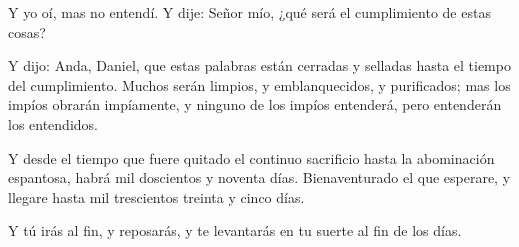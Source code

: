  Y yo oí, mas no entendí. Y dije: Señor mío, ¿qué será el
cumplimiento de estas cosas?

 Y dijo: Anda, Daniel, que estas palabras están cerradas y
selladas hasta el tiempo del cumplimiento.  Muchos serán
limpios, y emblanquecidos, y purificados; mas los impíos obrarán
impíamente, y ninguno de los impíos entenderá, pero entenderán los
entendidos.

 Y desde el tiempo que fuere quitado el continuo sacrificio
hasta la abominación espantosa, habrá mil doscientos y noventa días.
 Bienaventurado el que esperare, y llegare hasta mil
trescientos treinta y cinco días.

 Y tú irás al fin, y reposarás, y te levantarás en tu
suerte al fin de los días.
